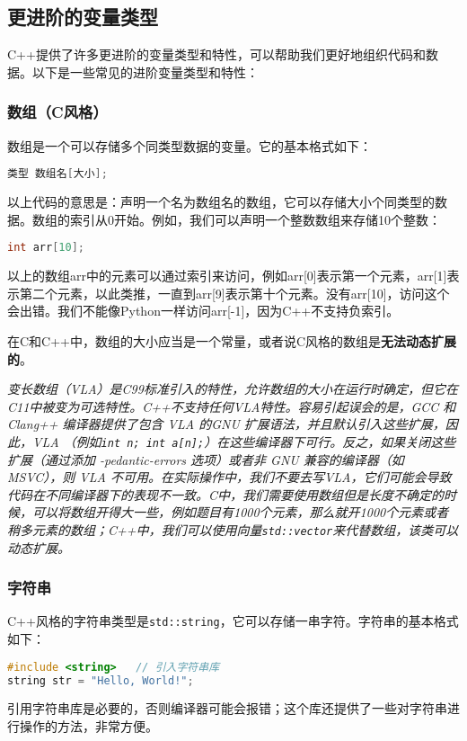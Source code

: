 \documentclass[../main.tex]{subfiles}
\begin{document}
\subsection{更进阶的变量类型}
C++提供了许多更进阶的变量类型和特性，可以帮助我们更好地组织代码和数据。以下是一些常见的进阶变量类型和特性：
\subsubsection{数组（C风格）}

数组是一个可以存储多个同类型数据的变量。它的基本格式如下：
\begin{lstlisting}[language=C++]
类型 数组名[大小];
\end{lstlisting}
以上代码的意思是：声明一个名为数组名的数组，它可以存储大小个同类型的数据。数组的索引从0开始。例如，我们可以声明一个整数数组来存储10个整数：
\begin{lstlisting}[language=C++]
int arr[10];
\end{lstlisting}
以上的数组arr中的元素可以通过索引来访问，例如arr[0]表示第一个元素，arr[1]表示第二个元素，以此类推，一直到arr[9]表示第十个元素。没有arr[10]，访问这个会出错。我们不能像Python一样访问arr[-1]，因为C++不支持负索引。

在C和C++中，数组的大小应当是一个常量，或者说C风格的数组是\textbf{无法动态扩展的}。

\emph{
  变长数组（VLA）是C99标准引入的特性，允许数组的大小在运行时确定，但它在C11中被变为可选特性。C++不支持任何VLA特性。容易引起误会的是，GCC 和 Clang++ 编译器提供了包含 VLA 的GNU 扩展语法，并且默认引入这些扩展，因此，VLA （例如\texttt{int n; int a[n];}）在这些编译器下可行。反之，如果关闭这些扩展（通过添加 -pedantic-errors 选项）或者非 GNU 兼容的编译器（如 MSVC），则 VLA 不可用。在实际操作中，我们不要去写VLA，它们可能会导致代码在不同编译器下的表现不一致。C中，我们需要使用数组但是长度不确定的时候，可以将数组开得大一些，例如题目有1000个元素，那么就开1000个元素或者稍多元素的数组；C++中，我们可以使用向量\texttt{std::vector}来代替数组，该类可以动态扩展。
}
\subsubsection{字符串}
C++风格的字符串类型是\texttt{std::string}，它可以存储一串字符。字符串的基本格式如下：
\begin{lstlisting}[language=C++]
#include <string>   // 引入字符串库
string str = "Hello, World!";
\end{lstlisting}
引用字符串库是必要的，否则编译器可能会报错；这个库还提供了一些对字符串进行操作的方法，非常方便。
\end{document}

